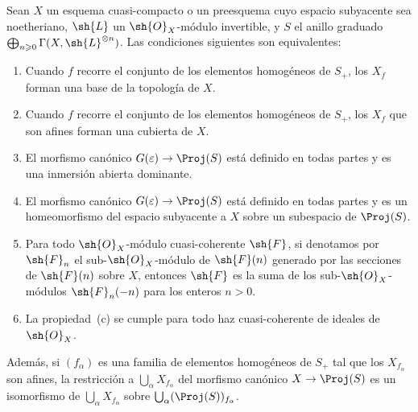 \documentclass[oneside,10pt]{amsart}
\makeatletter
\renewcommand{\geq}{\geqslant}
\newcommand{\ega@arrow}[2]{\mathchoice{#1}{#2}{#2}{#2}}
\renewcommand{\to}{\ega@arrow{\longrightarrow}{\rightarrow}}
\newcommand{\oldpage}[2][]{\marginnote{\normalfont\footnotesize\textbf{#1}~|~#2}\ignorespaces}
\let\EGAOriginalLabel\label
\renewcommand{\label}[1]{\phantomsection\EGAOriginalLabel{#1}}
\makeatother
\begin{document}
\begin{theorem}[4.5.2]
\label{II.4.5.2}
Sean $X$ un esquema cuasi-compacto o un preesquema cuyo espacio subyacente sea noetheriano, $\sh{L}$ un $\sh{O}_X$-módulo invertible, y $S$ el anillo graduado $\bigoplus_{n\geq0}\Gamma(X,\sh{L}^{\otimes n})$.
Las condiciones siguientes son equivalentes:
\begin{enumerate}
  \item[\rm{(a)}] Cuando $f$ recorre el conjunto de los elementos homogéneos de $S_+$, los $X_f$ forman una base de la topología de $X$.
  \item[\rm{(a')}] Cuando $f$ recorre el conjunto de los elementos homogéneos de $S_+$, los $X_f$ que son afines forman una cubierta de $X$.
  \item[\rm{(b)}] El morfismo canónico $G(\varepsilon)\to\Proj(S)$  está definido en todas partes y es una inmersión abierta dominante.
\oldpage[II]{84}
  \item[\rm{(b')}] El morfismo canónico $G(\varepsilon)\to\Proj(S)$ está definido en todas partes y es un homeomorfismo del espacio subyacente a $X$ sobre un subespacio de $\Proj(S)$.
  \item[\rm{(c)}] Para todo $\sh{O}_X$-módulo cuasi-coherente $\sh{F}$, si denotamos por $\sh{F}_n$ el sub-$\sh{O}_X$-módulo de $\sh{F}(n)$ generado por las secciones de $\sh{F}(n)$ sobre $X$, entonces $\sh{F}$ es la suma de los sub-$\sh{O}_X$-módulos $\sh{F}_n(-n)$ para los enteros $n>0$.
  \item[\rm{(c')}] La propiedad~\rm{(c)} se cumple para todo haz cuasi-coherente de ideales de $\sh{O}_X$.
\end{enumerate}

Además, si $(f_\alpha)$ es una familia de elementos homogéneos de $S_+$ tal que los $X_{f_\alpha}$ son afines, la restricción a $\bigcup_\alpha X_{f_\alpha}$ del morfismo canónico $X\to\Proj(S)$ es un isomorfismo de $\bigcup_\alpha X_{f_\alpha}$ sobre $\bigcup_\alpha(\Proj(S))_{f_\alpha}$.
\end{theorem}
\end{document}

